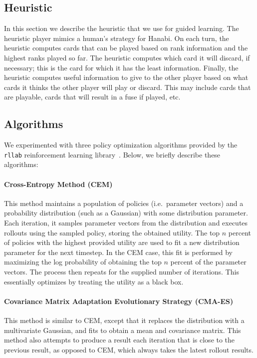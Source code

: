 \subsection{Heuristic}

In this section we describe the heuristic that we use for guided learning.  The
heuristic player mimics a human's strategy for Hanabi. On each turn, the
heuristic computes cards that can be played based on rank information and the
highest ranks played so far. The heuristic computes which card it will
discard, if necessary; this is the card for which it has the least information.
Finally, the heuristic computes useful information to give to the other player
based on what cards it thinks the other player will play or discard. This may
include cards that are playable, cards that will result in a fuse if played,
etc.

\subsection{Algorithms}
We experimented with three policy optimization algorithms provided by the
\texttt{rllab} reinforcement learning library~\cite{duan2016benchmarking}.
Below, we briefly describe these algorithms:

\paragraph{Cross-Entropy Method (CEM)~\cite{rubinstein2013cross,
policyoptimizationNIPS2016}}
This method maintains a population of policies (i.e.\ parameter vectors) and a
probability distribution (such as a Gaussian) with some distribution parameter.
Each iteration, it samples parameter vectors from the distribution and executes
rollouts using the sampled policy, storing the obtained utility.  The top $n$
percent of policies with the highest provided utility are used to fit a new
distribution parameter for the next timestep. In the CEM case, this fit is
performed by maximizing the log probability of obtaining the top $n$ percent of
the parameter vectors. The process then repeats for the supplied number of
iterations. This essentially optimizes by treating the utility as a black box.

\paragraph{Covariance Matrix Adaptation Evolutionary Strategy
(CMA-ES)~\cite{cmaes, policyoptimizationNIPS2016}}
This method is similar to CEM, except that it replaces the distribution with a
multivariate Gaussian, and fits to obtain a mean and covariance matrix.  This
method also attempts to produce a result each iteration that is close to the
previous result, as opposed to CEM, which always takes the latest rollout
results.

